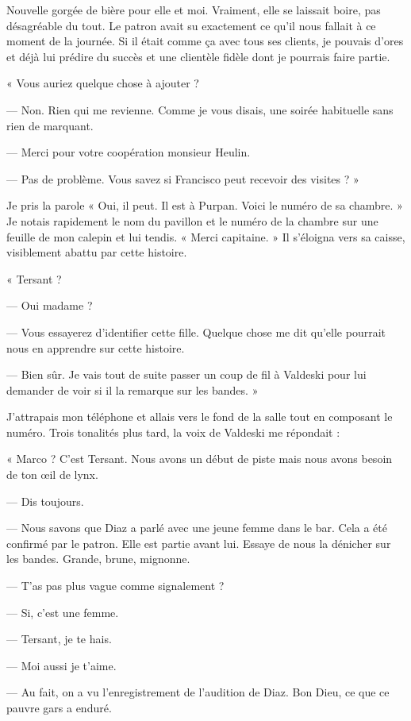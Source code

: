 Nouvelle gorgée de bière pour elle et moi. Vraiment, elle se laissait boire, pas désagréable du tout. Le patron avait 
su exactement ce qu'il nous fallait à ce moment de la journée. Si il était comme ça avec tous ses clients, je pouvais 
d'ores et déjà lui prédire du succès et une clientèle fidèle dont je pourrais faire partie.

« Vous auriez quelque chose à ajouter ?

— Non. Rien qui me revienne. Comme je vous disais, une soirée habituelle sans rien de marquant.

— Merci pour votre coopération monsieur Heulin.

— Pas de problème. Vous savez si Francisco peut recevoir des visites ? »

Je pris la parole « Oui, il peut. Il est à Purpan. Voici le numéro de sa chambre. » Je notais rapidement le nom du 
pavillon et le numéro de la chambre sur une feuille de mon calepin et lui tendis. « Merci capitaine. » Il s'éloigna 
vers sa caisse, visiblement abattu par cette histoire.

« Tersant ?

— Oui madame ?

— Vous essayerez d'identifier cette fille. Quelque chose me dit qu'elle pourrait nous en apprendre sur cette histoire.

— Bien sûr. Je vais tout de suite passer un coup de fil à Valdeski pour lui demander de voir si il la remarque sur les 
bandes. »

J'attrapais mon téléphone et allais vers le fond de la salle tout en composant le numéro. Trois tonalités plus tard, la 
voix de Valdeski me répondait :

« Marco ? C'est Tersant. Nous avons un début de piste mais nous avons besoin de ton œil de lynx.

— Dis toujours.

— Nous savons que Diaz a parlé avec une jeune femme dans le bar. Cela a été confirmé par le patron. Elle est partie 
avant lui. Essaye de nous la dénicher sur les bandes. Grande, brune, mignonne.

— T'as pas plus vague comme signalement ?

— Si, c'est une femme.

— Tersant, je te hais.

— Moi aussi je t'aime.

— Au fait, on a vu l'enregistrement de l'audition de Diaz. Bon Dieu, ce que ce pauvre gars a enduré.

